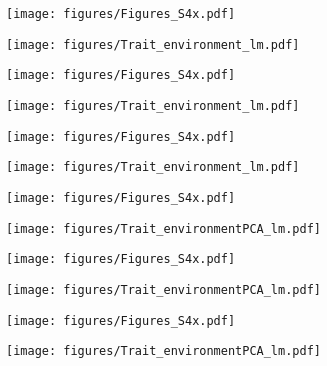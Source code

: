\documentclass{article}
\begin{document}
\begin{figure}
\begin{subfigure}{.5\textwidth}
\centering
\texttt{[image: figures/Figures\_S4x.pdf]}
\end{subfigure}%
\begin{subfigure}{.5\textwidth}
\texttt{[image: figures/Trait\_environment\_lm.pdf]}
\end{subfigure}
\end{figure}

\begin{figure}
\begin{subfigure}{.5\textwidth}
\centering
\texttt{[image: figures/Figures\_S4x.pdf]}
\end{subfigure}%
\begin{subfigure}{.5\textwidth}
\texttt{[image: figures/Trait\_environment\_lm.pdf]}
\end{subfigure}
\end{figure}

\begin{figure}
\begin{subfigure}{.5\textwidth}
\centering
\texttt{[image: figures/Figures\_S4x.pdf]}
\end{subfigure}%
\begin{subfigure}{.5\textwidth}
\texttt{[image: figures/Trait\_environment\_lm.pdf]}
\end{subfigure}
\end{figure}


\begin{figure}
\begin{subfigure}{.5\textwidth}
\centering
\texttt{[image: figures/Figures\_S4x.pdf]}
\end{subfigure}%
\begin{subfigure}{.5\textwidth}
\texttt{[image: figures/Trait\_environmentPCA\_lm.pdf]}
\end{subfigure}
\end{figure}


\begin{figure}
\begin{subfigure}{.5\textwidth}
\centering
\texttt{[image: figures/Figures\_S4x.pdf]}
\end{subfigure}%
\begin{subfigure}{.5\textwidth}
\texttt{[image: figures/Trait\_environmentPCA\_lm.pdf]}
\end{subfigure}
\end{figure}


\begin{figure}
\begin{subfigure}{.5\textwidth}
\centering
\texttt{[image: figures/Figures\_S4x.pdf]}
\end{subfigure}%
\begin{subfigure}{.5\textwidth}
\texttt{[image: figures/Trait\_environmentPCA\_lm.pdf]}
\end{subfigure}
\end{figure}
\end{document}
